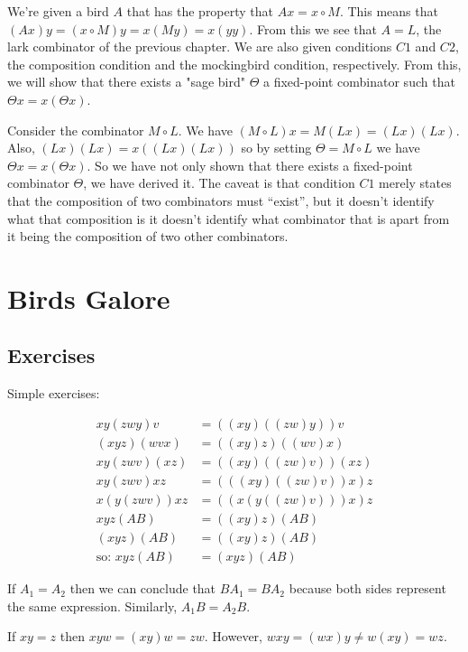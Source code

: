 We're given a bird $A$ that has the property that $Ax = x \circ M$.  This means
that $(Ax)y = (x \circ M)y = x(My) = x(yy)$.  From this we see that $A = L$, the
lark combinator of the previous chapter.  We are also given conditions $C1$ and
$C2$, the composition condition and the mockingbird condition, respectively.
From this, we will show that there exists a "sage bird" $\Theta$ \ie a
fixed-point combinator such that $\Theta x = x(\Theta x)$.

\vsep

\ni Consider the combinator $M \circ L$.  We have $(M \circ L)x = M(Lx) =
(Lx)(Lx)$.  Also, $(Lx)(Lx) = x((Lx)(Lx))$ so by setting $\Theta = M \circ L$ we
have $\Theta x = x(\Theta x)$.  So we have not only shown that there exists a
fixed-point combinator $\Theta$, we have derived it.  The caveat is that
condition $C1$ merely states that the composition of two combinators must
``exist'', but it doesn't identify what that composition is \ie it doesn't
identify what combinator that is apart from it being the composition of two
other combinators.

\chapter{Birds Galore}

\section{Exercises}

\ni Simple exercises:

\begin{align*}
xy(zwy)v &= ((xy)((zw)y))v \\
(xyz)(wvx) &= ((xy)z)((wv)x) \\
xy(zwv)(xz) &= ((xy)((zw)v))(xz) \\
xy(zwv)xz &= (((xy)((zw)v))x)z \\
x(y(zwv))xz &= ((x(y((zw)v)))x)z \\
xyz(AB) &= ((xy)z)(AB) \\
(xyz)(AB) &= ((xy)z)(AB) \\
\text{so: } xyz(AB) &= (xyz)(AB)
\end{align*}

\vsep

\ni If $A_1 = A_2$ then we can conclude that $BA_1 = BA_2$ because both sides
represent the same expression.  Similarly, $A_1B = A_2B$.

\vsep

\ni If $xy = z$ then $xyw = (xy)w = zw$.  However, $wxy = (wx)y \neq w(xy) =
wz$.

